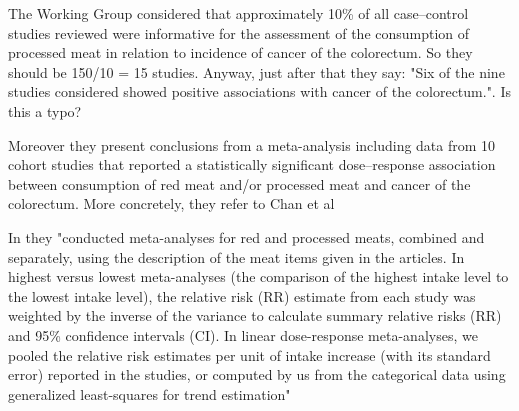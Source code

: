 \documentclass{article}
\begin{document}

The Working Group considered that approximately
10\% of all case–control studies reviewed
were informative for the assessment of the
consumption of processed meat in relation to
incidence of cancer of the colorectum. So they should be 150/10 = 15 studies. Anyway, just after that they say: "Six of the nine studies considered showed positive associations with cancer of the colorectum.". Is this a typo?

Moreover they present conclusions from a meta-analysis including data from 10
cohort studies that reported a statistically significant
dose–response association between consumption
of red meat and/or processed meat and cancer of
the colorectum. More concretely, they refer to Chan et al \cite{chan}



In \cite{chan} they "conducted meta-analyses
for red and processed meats, combined and separately, using the
description of the meat items given in the articles. In highest versus
lowest meta-analyses (the comparison of the highest intake level to
the lowest intake level), the relative risk (RR) estimate from each
study was weighted by the inverse of the variance to calculate
summary relative risks (RR) and 95\% confidence intervals (CI). In
linear dose-response meta-analyses, we pooled the relative risk
estimates per unit of intake increase (with its standard error)
reported in the studies, or computed by us from the categorical
data using generalized least-squares for trend estimation"
\end{document}
